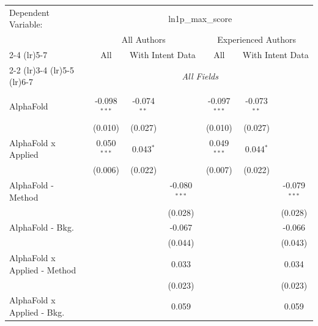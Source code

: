 \begingroup
\centering
\begin{tabular}{lcccccc}
   \tabularnewline \midrule \midrule
   Dependent Variable: & \multicolumn{6}{c}{ln1p\_max\_score}\\
 & \multicolumn{3}{c}{All Authors} & \multicolumn{3}{c}{Experienced Authors} \\
\cmidrule(lr){2-4} \cmidrule(lr){5-7}
 & \multicolumn{1}{c}{All} & \multicolumn{2}{c}{With Intent Data} & \multicolumn{1}{c}{All} & \multicolumn{2}{c}{With Intent Data} \\
\cmidrule(lr){2-2} \cmidrule(lr){3-4} \cmidrule(lr){5-5} \cmidrule(lr){6-7}
 & \multicolumn{6}{c}{\textit{All Fields}} \\ \\
   AlphaFold                      & -0.098$^{***}$ & -0.074$^{**}$ &                & -0.097$^{***}$ & -0.073$^{**}$ &   \\   
                                  & (0.010)        & (0.027)       &                & (0.010)        & (0.027)       &   \\   
   AlphaFold x Applied            & 0.050$^{***}$  & 0.043$^{*}$   &                & 0.049$^{***}$  & 0.044$^{*}$   &   \\   
                                  & (0.006)        & (0.022)       &                & (0.007)        & (0.022)       &   \\   
   AlphaFold - Method             &                &               & -0.080$^{***}$ &                &               & -0.079$^{***}$\\   
                                  &                &               & (0.028)        &                &               & (0.028)\\   
   AlphaFold - Bkg.               &                &               & -0.067         &                &               & -0.066\\   
                                  &                &               & (0.044)        &                &               & (0.043)\\   
   AlphaFold x Applied - Method   &                &               & 0.033          &                &               & 0.034\\   
                                  &                &               & (0.023)        &                &               & (0.023)\\   
   AlphaFold x Applied - Bkg.     &                &               & 0.059          &                &               & 0.059\\   

\end{tabular}
